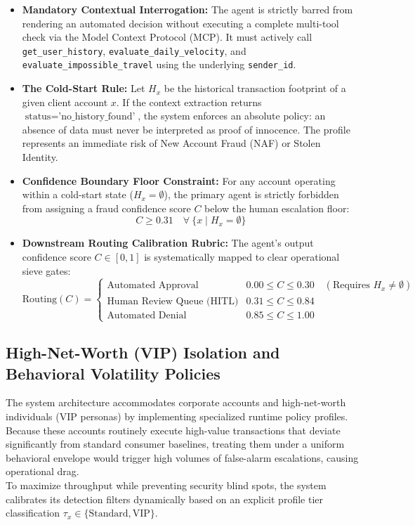 \documentclass[12pt]{report}
\begin{document}
\begin{itemize}

    \item \textbf{Mandatory Contextual Interrogation:} The agent is strictly barred from rendering an automated decision without executing a complete multi-tool check via the Model Context Protocol (MCP). It must actively call \texttt{get\_user\_history}, \texttt{evaluate\_daily\_velocity}, and \texttt{evaluate\_impossible\_travel} using the underlying \texttt{sender\_id}.
    \item \textbf{The Cold-Start Rule:} Let $H_x$ be the historical transaction footprint of a given client account $x$. If the context extraction returns $\text{status} = \text{'no\_history\_found'}$, the system enforces an absolute policy: an absence of data must never be interpreted as proof of innocence. The profile represents an immediate risk of New Account Fraud (NAF) or Stolen Identity.
    \item \textbf{Confidence Boundary Floor Constraint:} For any account operating within a cold-start state ($H_x = \emptyset$), the primary agent is strictly forbidden from assigning a fraud confidence score $C$ below the human escalation floor:
    $$
        C \ge 0.31 \quad \forall \ \{x \mid H_x = \emptyset\}
    $$
    \item \textbf{Downstream Routing Calibration Rubric:} The agent's output confidence score $C \in [0, 1]$ is systematically mapped to clear operational sieve gates:
    $$
        \text{Routing}(C) = 
        \begin{cases} 
            \text{Automated Approval} & 0.00 \le C \le 0.30 \quad (\text{Requires } H_x \neq \emptyset) \\
            \text{Human Review Queue (HITL)} & 0.31 \le C \le 0.84 \\
            \text{Automated Denial} & 0.85 \le C \le 1.00 
        \end{cases}
    $$
    
\end{itemize}

\subsection{High-Net-Worth (VIP) Isolation and Behavioral Volatility Policies}
The system architecture accommodates corporate accounts and high-net-worth individuals (VIP personas) by implementing specialized runtime policy profiles. Because these accounts routinely execute high-value transactions that deviate significantly from standard consumer baselines, treating them under a uniform behavioral envelope would trigger high volumes of false-alarm escalations, causing operational drag. 
\\
To maximize throughput while preventing security blind spots, the system calibrates its detection filters dynamically based on an explicit profile tier classification $\tau_{x} \in \{\text{Standard}, \text{VIP}\}$.
\end{document}
